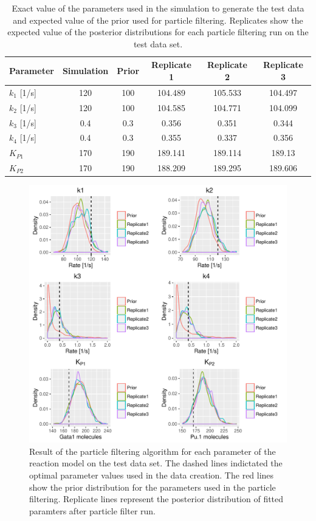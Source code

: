 \documentclass{bioinfo}
\begin{document}
\begin{table}[h]
\begin{center}
\begin{tabular}{l | c | c | c | c | c }
Parameter & Simulation & Prior & Replicate 1 & Replicate 2 & Replicate 3 \\
\hline
\texttt{$k_1$} [1/s]& 120 & 100 & 104.489 & 105.533 & 104.497\\
\texttt{$k_2$} [1/s]& 120 & 100 & 104.585 & 104.771 & 104.099\\
\texttt{$k_3$} [1/s]& 0.4 & 0.3 & 0.356 & 0.351 & 0.344\\
\texttt{$k_4$} [1/s]& 0.4 & 0.3 & 0.355 & 0.337 & 0.356\\
\texttt{$K_{P1}$} & 170 & 190 & 189.141 & 189.114 & 189.13\\
\texttt{$K_{P2}$} & 170 & 190 & 188.209 & 189.295 & 189.606\\
\end{tabular}

\vspace*{7pt}
\caption{Exact value of the parameters used in the simulation to generate the test data and expected value of the prior used for particle filtering. Replicates show the expected value of the posterior distributions for each particle filtering run on the test data set.}
\label{tab:01}
\end{center}
\end{table}

\begin{figure}[h]
\includegraphics[width=\textwidth]{figures/test_results.pdf}
\caption{Result of the particle filtering algorithm for each parameter of the reaction model on the test data set. The dashed lines indictated the optimal parameter values used in the data creation. The red lines show the prior distribution for the parameters used in the particle filtering. Replicate lines represent the posterior distribution of fitted paramters after particle filter run.}  \label{fig:04}
\end{figure}
\end{document}

